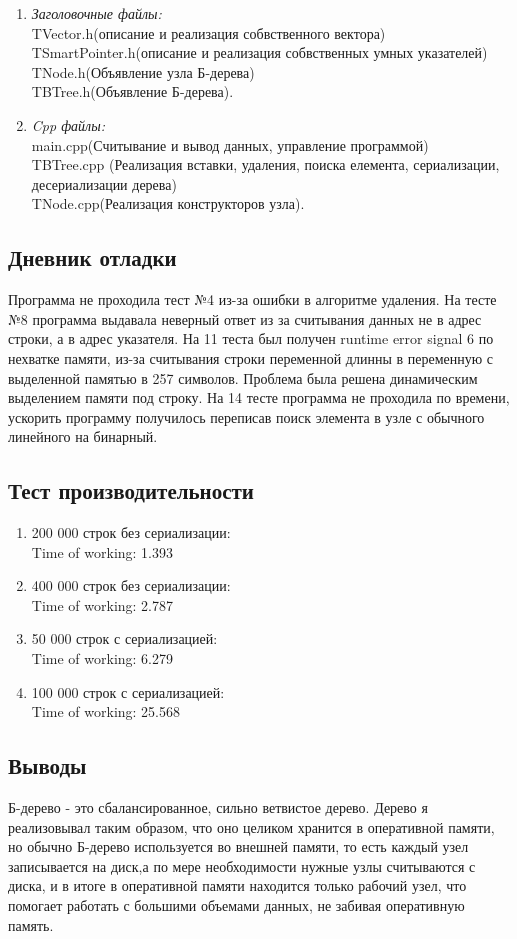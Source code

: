\documentclass[12pt]{article}
\begin{document}
\begin{enumerate}
\item\textsl{Заголовочные файлы:}\\ TVector.h(описание и реализация собвственного вектора)
 \\TSmartPointer.h(описание и реализация собвственных умных указателей)\\ TNode.h(Объявление узла Б-дерева)\\ TBTree.h(Объявление Б-дерева). 
\item\textsl{Cpp файлы:}\\ main.cpp(Считывание и вывод данных, управление программой)\\ TBTree.cpp (Реализация вставки, удаления, поиска елемента, сериализации, десериализации дерева)\\ TNode.cpp(Реализация конструкторов узла).
\end{enumerate}

\subsection*{Дневник отладки}

Программа не проходила тест №4 из-за ошибки в алгоритме удаления. На тесте №8 программа выдавала неверный ответ из за считывания данных не в адрес строки, а в адрес указателя. На 11 теста был получен runtime error signal 6 по нехватке памяти, из-за считывания строки переменной длинны в переменную с выделенной памятью в 257 символов. Проблема была решена динамическим выделением памяти под строку. На 14 тесте программа не проходила по времени, ускорить программу получилось переписав поиск элемента в узле с обычного линейного на бинарный. 

\subsection*{Тест производительности}
\begin{enumerate}
	\item 200 000 строк без сериализации: \\ Time of working: 1.393
	\item 400 000 строк без сериализации: \\ Time of working: 2.787
	\item 50 000 строк с сериализацией: \\ Time of working: 6.279
	\item 100 000 строк с сериализацией: \\ Time of working: 25.568
	
\end{enumerate}
\subsection*{Выводы}

Б-дерево - это сбалансированное, сильно ветвистое дерево. Дерево я реализовывал таким образом, что оно целиком хранится в оперативной памяти, но обычно Б-дерево используется во внешней памяти, то есть каждый узел записывается на диск,а по мере необходимости нужные узлы считываются с диска, и в итоге в оперативной памяти находится только рабочий узел, что помогает работать с большими объемами данных, не забивая оперативную память.
\end{document}
